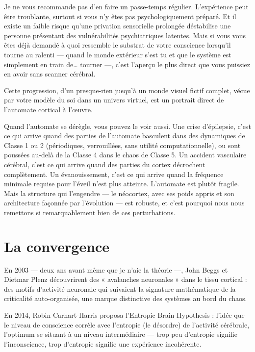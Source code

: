\documentclass[11pt, twoside, openright]{book}
\begin{document}
Je ne vous recommande pas d'en faire un passe-temps régulier. L'expérience peut être troublante, surtout si vous n'y êtes pas psychologiquement préparé. Et il existe un faible risque qu'une privation sensorielle prolongée déstabilise une personne présentant des vulnérabilités psychiatriques latentes. Mais si vous vous êtes déjà demandé à quoi ressemble le substrat de votre conscience lorsqu'il tourne au ralenti --- quand le monde extérieur s'est tu et que le système est simplement en train de… tourner ---, c'est l'aperçu le plus direct que vous puissiez en avoir sans scanner cérébral.

Cette progression, d'un presque-rien jusqu'à un monde visuel fictif complet, vécue par votre modèle du soi dans un univers virtuel, est un portrait direct de l'automate cortical à l'œuvre.

Quand l'automate se dérègle, vous pouvez le voir aussi. Une crise d'épilepsie, c'est ce qui arrive quand des parties de l'automate basculent dans des dynamiques de Classe 1 ou 2 (périodiques, verrouillées, sans utilité computationnelle), ou sont poussées au-delà de la Classe 4 dans le chaos de Classe 5. Un accident vasculaire cérébral, c'est ce qui arrive quand des parties du cortex décrochent complètement. Un évanouissement, c'est ce qui arrive quand la fréquence minimale requise pour l'éveil n'est plus atteinte. L'automate est plutôt fragile. Mais la structure qui l'engendre --- le néocortex, avec ses poids appris et son architecture façonnée par l'évolution --- est robuste, et c'est pourquoi nous nous remettons si remarquablement bien de ces perturbations.

\section*{La convergence}

En 2003 --- deux ans avant même que je n'aie la théorie ---, John Beggs et Dietmar Plenz découvrirent des « avalanches neuronales » dans le tissu cortical : des motifs d'activité neuronale qui suivaient la signature mathématique de la criticalité auto-organisée, une marque distinctive des systèmes au bord du chaos.

En 2014, Robin Carhart-Harris proposa l'Entropic Brain Hypothesis : l'idée que le niveau de conscience corrèle avec l'entropie (le désordre) de l'activité cérébrale, l'optimum se situant à un niveau intermédiaire --- trop peu d'entropie signifie l'inconscience, trop d'entropie signifie une expérience incohérente.
\end{document}

